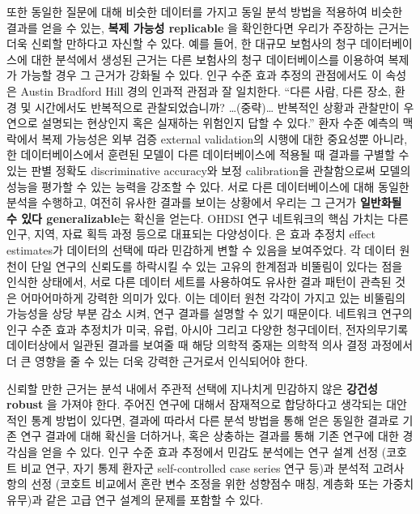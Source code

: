 \documentclass[10.5pt]{book}
\theoremstyle{definition}
\theoremstyle{definition}
\theoremstyle{definition}
\theoremstyle{remark}
\begin{document}
또한 동일한 질문에 대해 비슷한 데이터를 가지고 동일 분석 방법을 적용하여
비슷한 결과를 얻을 수 있는, \textbf{복제 가능성 replicable} 을
확인한다면 우리가 주장하는 근거는 더욱 신뢰할 만하다고 자신할 수 있다.
예를 들어, 한 대규모 보험사의 청구 데이터베이스에 대한 분석에서 생성된
근거는 다른 보험사의 청구 데이터베이스를 이용하여 복제가 가능할 경우 그
근거가 강화될 수 있다. 인구 수준 효과 추정의 관점에서도 이 속성은 Austin
Bradford Hill 경의 인과적 관점과 잘 일치한다. ``다른 사람, 다른 장소,
환경 및 시간에서도 반복적으로 관찰되었습니까? \ldots{}(중략)\ldots{}
반복적인 상황과 관찰만이 우연으로 설명되는 현상인지 혹은 실재하는
위험인지 답할 수 있다.'' \citep{hill_1965} 환자 수준 예측의 맥락에서
복제 가능성은 외부 검증 external validation의 시행에 대한 중요성뿐
아니라, 한 데이터베이스에서 훈련된 모델이 다른 데이터베이스에 적용될 때
결과를 구별할 수 있는 판별 정확도 discriminative accuracy와 보정
calibration을 관찰함으로써 모델의 성능을 평가할 수 있는 능력을 강조할 수
있다. 서로 다른 데이터베이스에 대해 동일한 분석을 수행하고, 여전히
유사한 결과를 보이는 상황에서 우리는 그 근거가 \textbf{일반화될 수 있다
generalizable}는 확신을 얻는다. OHDSI 연구 네트워크의 핵심 가치는 다른
인구, 지역, 자료 획득 과정 등으로 대표되는 다양성이다.
\citet{madigan_2013} 은 효과 추정치 effect estimates가 데이터의 선택에
따라 민감하게 변할 수 있음을 보여주었다. 각 데이터 원천이 단일 연구의
신뢰도를 하락시킬 수 있는 고유의 한계점과 비뚤림이 있다는 점을 인식한
상태에서, 서로 다른 데이터 세트를 사용하여도 유사한 결과 패턴이 관측된
것은 어마어마하게 강력한 의미가 있다. 이는 데이터 원천 각각이 가지고
있는 비뚤림의 가능성을 상당 부분 감소 시켜, 연구 결과를 설명할 수 있기
때문이다. 네트워크 연구의 인구 수준 효과 추정치가 미국, 유럽, 아시아
그리고 다양한 청구데이터, 전자의무기록 데이터상에서 일관된 결과를 보여줄
때 해당 의학적 중재는 의학적 의사 결정 과정에서 더 큰 영향을 줄 수 있는
더욱 강력한 근거로서 인식되어야 한다.

신뢰할 만한 근거는 분석 내에서 주관적 선택에 지나치게 민감하지 않은
\textbf{강건성 robust} 을 가져야 한다. 주어진 연구에 대해서 잠재적으로
합당하다고 생각되는 대안적인 통계 방법이 있다면, 결과에 따라서 다른 분석
방법을 통해 얻은 동일한 결과로 기존 연구 결과에 대해 확신을 더하거나,
혹은 상충하는 결과를 통해 기존 연구에 대한 경각심을 얻을 수 있다.
\citep{madigan2013design} 인구 수준 효과 추정에서 민감도 분석에는 연구
설계 선정 (코호트 비교 연구, 자기 통제 환자군 self-controlled case
series 연구 등)과 분석적 고려사항의 선정 (코호트 비교에서 혼란 변수
조정을 위한 성향점수 매칭, 계층화 또는 가중치 유무)과 같은 고급 연구
설계의 문제를 포함할 수 있다.
\end{document}
